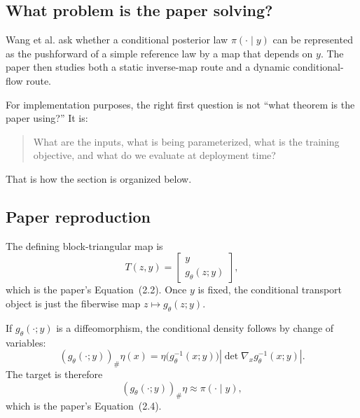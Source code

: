 \documentclass[11pt]{report}
\newcommand{\pushf}[2]{\left(#1\right)_{\#} #2}
\begin{document}
\subsection*{What problem is the paper solving?}

Wang et al. ask whether a conditional posterior law $\pi(\cdot\mid y)$ can be
represented as the pushforward of a simple reference law by a map that depends on
$y$.  The paper then studies both a static inverse-map route and a dynamic
conditional-flow route.

For implementation purposes, the right first question is not ``what theorem is the
paper using?''  It is:
\begin{quote}
What are the inputs, what is being parameterized, what is the training objective,
and what do we evaluate at deployment time?
\end{quote}
That is how the section is organized below.

\subsection*{Paper reproduction}

The defining block-triangular map is
\begin{equation}
T(z,y)=
\begin{bmatrix}
 y \\
 g_\theta(z;y)
\end{bmatrix},
\label{eq:wang-block-triangular}
\end{equation}
which is the paper's Equation~(2.2).  Once $y$ is fixed, the conditional transport
object is just the fiberwise map $z\mapsto g_\theta(z;y)$.

If $g_\theta(\cdot;y)$ is a diffeomorphism, the conditional density follows by
change of variables:
\begin{equation}
\pushf{g_\theta(\cdot;y)}{\eta}(x)
=
\eta\bigl(g_\theta^{-1}(x;y)\bigr)
\left|\det \nabla_x g_\theta^{-1}(x;y)\right|.
\label{eq:wang-pushforward-density}
\end{equation}
The target is therefore
\begin{equation}
\pushf{g_\theta(\cdot;y)}{\eta} \approx \pi(\cdot\mid y),
\label{eq:wang-conditional-target}
\end{equation}
which is the paper's Equation~(2.4).
\end{document}
